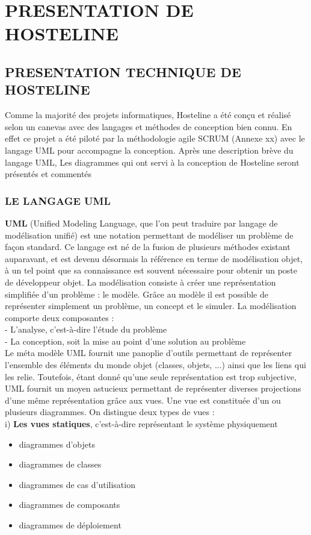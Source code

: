 \chapter{PRESENTATION DE HOSTELINE}

\section{PRESENTATION TECHNIQUE  DE HOSTELINE}
 Comme la majorité des projets informatiques, Hosteline a été conçu et réalisé selon un canevas avec des langages et méthodes de conception bien connu. En effet ce projet a été piloté par la méthodologie agile SCRUM (Annexe xx) avec le langage UML pour accompagne la conception. Après une description brève du langage UML, Les diagrammes qui ont servi à la conception de Hosteline seront présentés et commentés
 
 \subsection{LE LANGAGE UML}
\textbf{ UML} (Unified Modeling Language, que l’on peut traduire par langage de modélisation unifié) est une notation permettant de modéliser un problème de façon standard. Ce langage est né de la fusion de plusieurs méthodes existant auparavant, et est devenu désormais la référence en terme de modélisation objet, à un tel point que sa connaissance est souvent nécessaire pour obtenir un poste de développeur objet. La modélisation consiste à créer une représentation simplifiée d’un problème : le modèle. Grâce au modèle il est possible de représenter simplement un problème, un concept et le simuler. La modélisation comporte deux composantes :\\
-	L’analyse, c’est-à-dire l’étude du problème\\
-	La conception, soit la mise au point d’une solution au problème\\

Le méta modèle UML fournit une panoplie d’outils permettant de représenter l’ensemble des éléments du monde objet (classes, objets, ...) ainsi que les liens qui les relie. Toutefois, étant donné qu’une seule représentation est trop subjective, UML fournit un moyen astucieux permettant de représenter diverses projections d’une même représentation grâce aux vues. Une vue est constituée d’un ou plusieurs diagrammes. On distingue deux types de vues :\\

i)	\textbf{Les vues statiques}, c’est-à-dire représentant le système physiquement
	\begin{itemize}
		\item diagrammes d’objets
		\item diagrammes de classes
		\item diagrammes de cas d’utilisation
		\item diagrammes de composants
		\item diagrammes de déploiement
	\end{itemize}
	 
